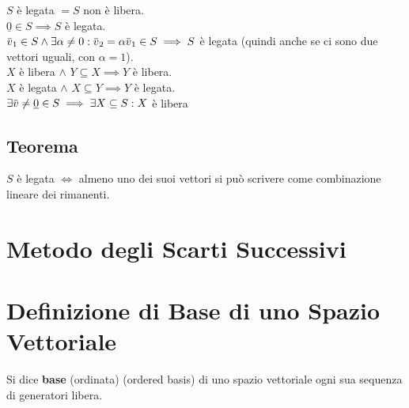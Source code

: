 \documentclass[a4paper, twoside, italian, 11pt]{book}
\newcommand{\braces}[1] {\left \{ #1 \right \}}
\newcommand{\overbar}[1] {\mkern 1.5mu\overline{\mkern-1.5mu#1\mkern-1.5mu}\mkern 1.5mu}
\newcommand{\LS}{\mathcal L}
\begin{document}
\noindent
$S$ è legata $= S$ non è libera. \\
$\underline 0 \in S \implies S$ è legata. \\
$\overbar v_1 \in S \land \exists \alpha \neq 0 : \overbar v_2 = \alpha \overbar v_1 \in S \implies S$ è legata (quindi anche se ci sono due vettori uguali, con $\alpha = 1$). \\
$X$ è libera $\land$ $Y \subseteq X \implies Y$ è libera. \\
$X$ è legata $\land$ $X \subseteq Y \implies Y$ è legata. \\
$\exists \overbar v \neq \underline 0 \in S \implies \exists X \subseteq S : X$ è libera

\subsection{Teorema}

$S$ è legata $\iff$ almeno uno dei suoi vettori si può scrivere come combinazione lineare dei rimanenti.









\section{Metodo degli Scarti Successivi}




\section{Definizione di Base di uno Spazio Vettoriale}

Si dice \textbf{base} (ordinata) (ordered basis) di uno spazio vettoriale ogni sua sequenza di generatori libera. \\
\end{document}
